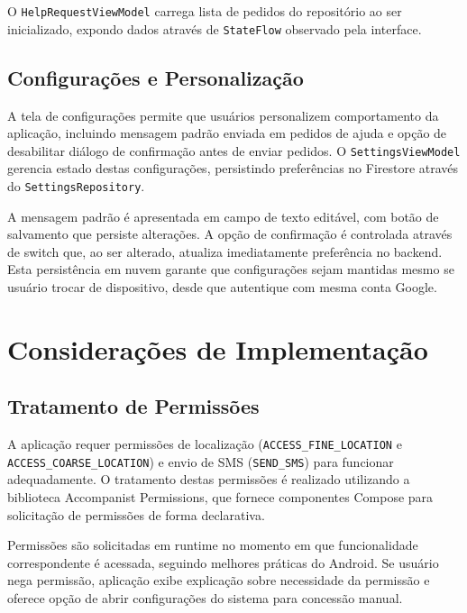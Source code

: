 O \texttt{HelpRequestViewModel} carrega lista de pedidos do repositório ao ser inicializado, expondo dados através de \texttt{StateFlow} observado pela interface. 

\subsection{Configurações e Personalização}
A tela de configurações permite que usuários personalizem comportamento da aplicação, incluindo mensagem padrão enviada em pedidos de ajuda e opção de desabilitar diálogo de confirmação antes de enviar pedidos. O \texttt{SettingsViewModel} gerencia estado destas configurações, persistindo preferências no Firestore através do \texttt{SettingsRepository}.

A mensagem padrão é apresentada em campo de texto editável, com botão de salvamento que persiste alterações. A opção de confirmação é controlada através de switch que, ao ser alterado, atualiza imediatamente preferência no backend. Esta persistência em nuvem garante que configurações sejam mantidas mesmo se usuário trocar de dispositivo, desde que autentique com mesma conta Google.

\section{Considerações de Implementação}
\subsection{Tratamento de Permissões}
A aplicação requer permissões de localização (\texttt{ACCESS\_FINE\_LOCATION} e \texttt{ACCESS\_COARSE\_LOCATION}) e envio de SMS (\texttt{SEND\_SMS}) para funcionar adequadamente. O tratamento destas permissões é realizado utilizando a biblioteca Accompanist Permissions, que fornece componentes Compose para solicitação de permissões de forma declarativa.

Permissões são solicitadas em runtime no momento em que funcionalidade correspondente é acessada, seguindo melhores práticas do Android. Se usuário nega permissão, aplicação exibe explicação sobre necessidade da permissão e oferece opção de abrir configurações do sistema para concessão manual.


